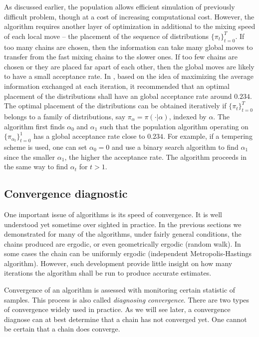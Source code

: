 As discussed earlier, the population \mcmc allows efficient simulation of
previously difficult problem, though at a cost of increasing computational
cost. However, the algorithm requires another layer of optimization in
additional to the mixing speed of each local move -- the placement of the
sequence of distributions $\{\pi_t\}_{t=0}^T$. If too many chains are chosen,
then the information can take many global moves to transfer from the fast
mixing chains to the slower ones. If too few chains are chosen or they are
placed far apart of each other, then the global moves are likely to have a
small acceptance rate. In \cite{Atchade:2010ha}, based on the idea of
maximizing the average information exchanged at each iteration, it recommended
that an optimal placement of the distributions shall have an global acceptance
rate around $0.234$. The optimal placement of the distributions can be
obtained iteratively if $\{\pi_t\}_{t=0}^T$ belongs to a family of
distributions, say $\pi_{\alpha} = \pi(\cdot|\alpha)$, indexed by $\alpha$.
The algorithm first finds $\alpha_0$ and $\alpha_1$ such that the population
\mcmc algorithm operating on $\{\pi_{\alpha_t}\}_{t=0}^1$ has a global
acceptance rate close to $0.234$.  For example, if a tempering scheme is used,
one can set $\alpha_0 = 0$ and use a binary search algorithm to find
$\alpha_1$ since the smaller $\alpha_1$, the higher the acceptance rate. The
algorithm proceeds in the same way to find $\alpha_t$ for $t>1$.

\subsection{Convergence diagnostic}
\label{sub:Convergence diagnostic}

One important issue of \mcmc algorithms is its speed of convergence. It is
well understood yet sometime over sighted in practice. In the previous
sections we demonstrated for many of the algorithms, under fairly general
conditions, the chains produced are ergodic, or even geometrically ergodic
(random walk). In some cases the chain can be uniformly ergodic (independent
Metropolis-Hastings algorithm). However, such development provide little
insight on how many iterations the algorithm shall be run to produce accurate
estimates.

Convergence of an \mcmc algorithm is assessed with monitoring certain
statistic of samples. This process is also called \emph{diagnosing
  convergence}. There are two types of convergence
\cite[][chap.~12]{Robert:2004tn} widely used in practice. As we will see
later, a convergence diagnose can at best determine that a chain has not
converged yet. One cannot be certain that a chain does converge.

